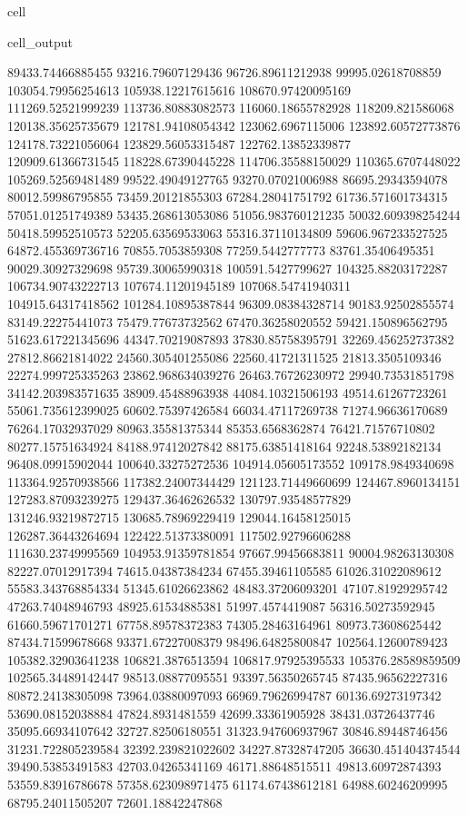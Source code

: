 \documentclass[letterpaper,10pt,english]{jupyterBook}
\begin{document}
\begin{sphinxuseclass}{cell}
\begin{sphinxVerbatimOutput}
\begin{sphinxuseclass}{cell_output}
\begin{sphinxVerbatim}[commandchars=\\\{\}]
89433.74466885455  93216.79607129436  96726.89611212938  99995.02618708859  103054.79956254613  105938.12217615616  108670.97420095169  111269.52521999239  113736.80883082573  116060.18655782928  118209.821586068  120138.35625735679  121781.94108054342  123062.6967115006  123892.60572773876  124178.73221056064  123829.56053315487  122762.13852339877  120909.61366731545  118228.67390445228  114706.35588150029  110365.6707448022  105269.52569481489  99522.49049127765  93270.07021006988  86695.29343594078  80012.59986795855  73459.20121855303  67284.28041751792  61736.571601734315  57051.01251749389  53435.268613053086  51056.983760121235  50032.609398254244  50418.59952510573  52205.63569533063  55316.37110134809  59606.967233527525  64872.455369736716  70855.7053859308  77259.5442777773  83761.35406495351  90029.30927329698  95739.30065990318  100591.5427799627  104325.88203172287  106734.90743222713  107674.11201945189  107068.54741940311  104915.64317418562  101284.10895387844  96309.08384328714  90183.92502855574  83149.22275441073  75479.77673732562  67470.36258020552  59421.150896562795  51623.617221345696  44347.70219087893  37830.85758395791  32269.456252737382  27812.86621814022  24560.305401255086  22560.41721311525  21813.3505109346  22274.999725335263  23862.968634039276  26463.76726230972  29940.73531851798  34142.203983571635  38909.45488963938  44084.10321506193  49514.61267723261  55061.735612399025  60602.75397426584  66034.47117269738  71274.96636170689  76264.17032937029  80963.35581375344  85353.6568362874  
76421.71576710802  80277.15751634924  84188.97412027842  88175.63851418164  92248.53892182134  96408.09915902044  100640.33275272536  104914.05605173552  109178.9849340698  113364.92570938566  117382.24007344429  121123.71449660699  124467.8960134151  127283.87093239275  129437.36462626532  130797.93548577829  131246.93219872715  130685.78969229419  129044.16458125015  126287.36443264694  122422.51373380091  117502.92796606288  111630.23749995569  104953.91359781854  97667.99456683811  90004.98263130308  82227.07012917394  74615.04387384234  67455.39461105585  61026.31022089612  55583.343768854334  51345.61026623862  48483.37206093201  47107.81929295742  47263.74048946793  48925.61534885381  51997.4574419087  56316.50273592945  61660.59671701271  67758.89578372383  74305.28463164961  80973.73608625442  87434.71599678668  93371.67227008379  98496.64825800847  102564.12600789423  105382.32903641238  106821.3876513594  106817.97925395533  105376.28589859509  102565.34489142447  98513.08877095551  93397.56350265745  87435.96562227316  80872.24138305098  73964.03880097093  66969.79626994787  60136.69273197342  53690.08152038884  47824.8931481559  42699.33361905928  38431.03726437746  35095.66934107642  32727.82506180551  31323.947606937967  30846.89448746456  31231.722805239584  32392.239821022602  34227.87328747205  36630.451404374544  39490.53853491583  42703.04265341169  46171.88648515511  49813.60972874393  53559.83916786678  57358.623098971475  61174.67438612181  64988.60246209995  68795.24011505207  72601.18842247868  

\end{sphinxVerbatim}
\end{sphinxuseclass}
\end{sphinxVerbatimOutput}
\end{sphinxuseclass}
\end{document}
